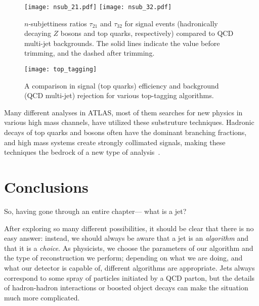 
\begin{figure}
\centering
\texttt{[image: nsub\_21.pdf]}
\texttt{[image: nsub\_32.pdf]}
\caption{$n$-subjettiness ratios $\tau_{21}$ and $\tau_{32}$ for signal events (hadronically decaying $Z$ bosons and top quarks, respectively) compared to QCD multi-jet backgrounds. The solid lines indicate the value before trimming, and the dashed after trimming.}
\label{fig:jets:nsub}
\end{figure}




\begin{figure}
\centering
\texttt{[image: top\_tagging]}
\caption{A comparison in signal (top quarks) efficiency and background (QCD multi-jet) rejection for various top-tagging algorithms.}
\label{fig:jets:top_tagging}
\end{figure}





Many different analyses in ATLAS, most of them searches for new physics in various high mass channels, have utilized these substruture techniques. Hadronic decays of top quarks and bosons often have the dominant branching fractions, and high mass systems create strongly collimated signals, making these techniques the bedrock of a new type of analysis~\cite{Aad:2015owa,Aad:2015fna,Aad:2014xea,Aad:2014kra,Aad:2014bva,Aad:2013wta,ATLAS:2012dp,RPVSUSY}.

\section{Conclusions}

So, having gone through an entire chapter--- what is a jet?

After exploring so many different possibilities, it should be clear that there is no easy answer: instead, we should always be aware that a jet is an \textit{algorithm} and that it is a \textit{choice}. As physicists, we choose the parameters of our algorithm and the type of reconstruction we perform; depending on what we are doing, and what our detector is capable of, different algorithms are appropriate. Jets always correspond to some spray of particles initiated by a QCD parton, but the details of hadron-hadron interactions or boosted object decays can make the situation much more complicated.

